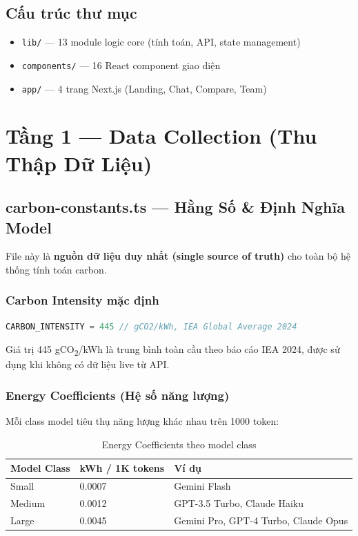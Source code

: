 \documentclass[12pt,a4paper]{article}
\begin{document}
\subsection{Cấu trúc thư mục}

\begin{itemize}[leftmargin=1.5cm]
    \item \texttt{lib/} — 13 module logic core (tính toán, API, state management)
    \item \texttt{components/} — 16 React component giao diện
    \item \texttt{app/} — 4 trang Next.js (Landing, Chat, Compare, Team)
\end{itemize}

\section{Tầng 1 — Data Collection (Thu Thập Dữ Liệu)}

\subsection{carbon-constants.ts — Hằng Số \& Định Nghĩa Model}

File này là \textbf{nguồn dữ liệu duy nhất (single source of truth)} cho toàn bộ hệ thống tính toán carbon.

\subsubsection{Carbon Intensity mặc định}

\begin{lstlisting}[language=Java]
CARBON_INTENSITY = 445 // gCO2/kWh, IEA Global Average 2024
\end{lstlisting}

Giá trị 445 gCO\textsubscript{2}/kWh là trung bình toàn cầu theo báo cáo IEA 2024, được sử dụng khi không có dữ liệu live từ API.

\subsubsection{Energy Coefficients (Hệ số năng lượng)}

Mỗi class model tiêu thụ năng lượng khác nhau trên 1000 token:

\begin{table}[h]
    \centering
    \begin{tabular}{lll}
        \toprule
        \textbf{Model Class} & \textbf{kWh / 1K tokens} & \textbf{Ví dụ} \\
        \midrule
        Small  & 0.0007 & Gemini Flash \\
        Medium & 0.0012 & GPT-3.5 Turbo, Claude Haiku \\
        Large  & 0.0045 & Gemini Pro, GPT-4 Turbo, Claude Opus \\
        \bottomrule
    \end{tabular}
    \caption{Energy Coefficients theo model class}
\end{table}
\end{document}
